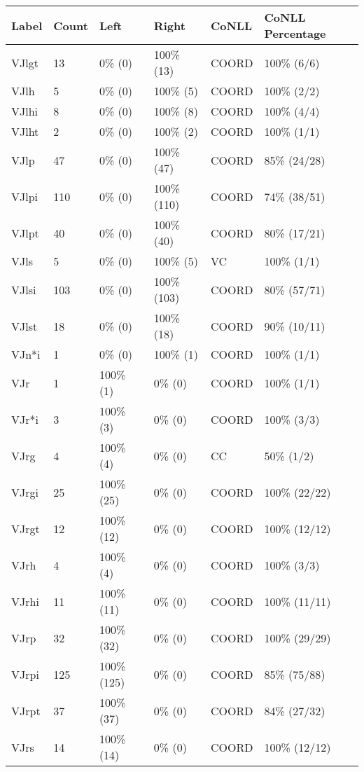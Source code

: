 \begin{figure*}
\begin{tabular}{|l|l|l|l||l|l|}
\hline
Label & Count & Left & Right & CoNLL & CoNLL Percentage\\ 
\hline
 VJlgt & 13 & 0\% (0) & 100\% (13) & COORD & 100\% (6/6) \\ 
\hline
 VJlh & 5 & 0\% (0) & 100\% (5) & COORD & 100\% (2/2) \\ 
\hline
 VJlhi & 8 & 0\% (0) & 100\% (8) & COORD & 100\% (4/4) \\ 
\hline
 VJlht & 2 & 0\% (0) & 100\% (2) & COORD & 100\% (1/1) \\ 
\hline
 VJlp & 47 & 0\% (0) & 100\% (47) & COORD & 85\% (24/28) \\ 
\hline
 VJlpi & 110 & 0\% (0) & 100\% (110) & COORD & 74\% (38/51) \\ 
\hline
 VJlpt & 40 & 0\% (0) & 100\% (40) & COORD & 80\% (17/21) \\ 
\hline
 VJls & 5 & 0\% (0) & 100\% (5) & VC & 100\% (1/1) \\ 
\hline
 VJlsi & 103 & 0\% (0) & 100\% (103) & COORD & 80\% (57/71) \\ 
\hline
 VJlst & 18 & 0\% (0) & 100\% (18) & COORD & 90\% (10/11) \\ 
\hline
 VJn*i & 1 & 0\% (0) & 100\% (1) & COORD & 100\% (1/1) \\ 
\hline
 VJr & 1 & 100\% (1) & 0\% (0) & COORD & 100\% (1/1) \\ 
\hline
 VJr*i & 3 & 100\% (3) & 0\% (0) & COORD & 100\% (3/3) \\ 
\hline
 VJrg & 4 & 100\% (4) & 0\% (0) & CC & 50\% (1/2) \\ 
\hline
 VJrgi & 25 & 100\% (25) & 0\% (0) & COORD & 100\% (22/22) \\ 
\hline
 VJrgt & 12 & 100\% (12) & 0\% (0) & COORD & 100\% (12/12) \\ 
\hline
 VJrh & 4 & 100\% (4) & 0\% (0) & COORD & 100\% (3/3) \\ 
\hline
 VJrhi & 11 & 100\% (11) & 0\% (0) & COORD & 100\% (11/11) \\ 
\hline
 VJrp & 32 & 100\% (32) & 0\% (0) & COORD & 100\% (29/29) \\ 
\hline
 VJrpi & 125 & 100\% (125) & 0\% (0) & COORD & 85\% (75/88) \\ 
\hline
 VJrpt & 37 & 100\% (37) & 0\% (0) & COORD & 84\% (27/32) \\ 
\hline
 VJrs & 14 & 100\% (14) & 0\% (0) & COORD & 100\% (12/12) \\ 
\hline

\end{tabular}
\end{figure*}
